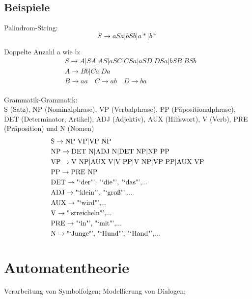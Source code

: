 \documentclass[german,color,6pt]{latex4ei/latex4ei_sheet}
\begin{document}
\begin{sectionbox}
\subsection{Beispiele}
Palindrom-String:
\begin{equation*}
S \rightarrow aSa | bSb | a* | b*
\end{equation*}

Doppelte Anzahl a wie b:
\begin{equation*}
\begin{split}
	& S \rightarrow A | SA | AS | aSC | CSa | aSD | DSa | bSB | BSb \\
	& A \rightarrow Bb | Ca | Da \\
	& B \rightarrow aa \quad C \rightarrow ab \quad D \rightarrow ba \\
\end{split}
\end{equation*}

Grammatik-Grammatik:\\
S (Satz), NP (Nominalphrase), VP (Verbalphrase), PP (Päpositionalphrase), DET (Determinator, Artikel), ADJ (Adjektiv), AUX (Hilfswort), V (Verb), PRE (Präposition) und N (Nomen)
\begin{equation*}
\begin{split}
	&  \text{S} \rightarrow \text{NP VP} | \text{VP NP}\\
	& \text{NP} \rightarrow  \text{DET N} |  \text{ADJ N} |  \text{DET NP} |  \text{NP PP}\\
	&  \text{VP} \rightarrow  \text{V NP} |  \text{AUX V} |  \text{V PP} |  \text{V NP} |  \text{VP PP} |  \text{AUX VP}\\
	&  \text{PP} \rightarrow  \text{PRE NP}\\
	&  \text{DET} \rightarrow  \text{"`der"', "`die"', "`das"',...}\\
	&  \text{ADJ} \rightarrow  \text{"`klein"', "`groß"',...}\\
	&  \text{AUX} \rightarrow  \text{"`wird"',...}\\
	&  \text{V} \rightarrow  \text{"`streicheln"',...}\\
	&  \text{PRE} \rightarrow  \text{"`in"', "`mit"',...}\\
	&  \text{N} \rightarrow  \text{"`Junge"', "`Hund"', "`Hand"',...}\\
\end{split}
\end{equation*}
\end{sectionbox}


\section{Automatentheorie}
\begin{symbolbox}
Verarbeitung von Symbolfolgen; Modellierung von Dialogen;
\end{symbolbox}
\end{document}
